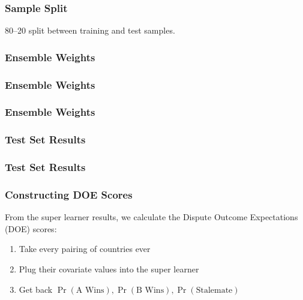 \documentclass[10pt]{beamer}
\begin{document}
\begin{frame}
\begin{center}
  \end{center}
\end{frame}

\begin{frame}
  \frametitle{Sample Split}

  80--20 split between training and test samples.

  \begin{center}
    
  \end{center}
\end{frame}

\begin{frame}
  \frametitle{Ensemble Weights}

  \centering
  
\end{frame}

\begin{frame}
  \frametitle{Ensemble Weights}

  \centering
  

  \vspace{-3em}
  
\end{frame}

\begin{frame}
  \frametitle{Ensemble Weights}

  \centering
  
\end{frame}

\begin{frame}
  \frametitle{Test Set Results}

  \centering
  
\end{frame}

\begin{frame}
  \frametitle{Test Set Results}

  \centering
\end{frame}

\begin{frame}
  \frametitle{Constructing DOE Scores}

  From the super learner results, we calculate the Dispute Outcome Expectations (DOE) scores:
  \begin{enumerate}
    \item Take every pairing of countries ever

    \item Plug their covariate values into the super learner

    \item Get back $\Pr(\text{A Wins}), \Pr(\text{B Wins}), \Pr(\text{Stalemate})$
  \end{enumerate}
\end{frame}
\end{document}
